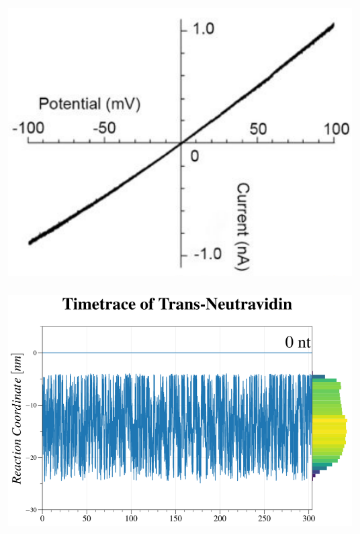 \begin{figure}[ht]

  \begin{centering}
  \begin{subfigure}[t]{\dimexpr.29\linewidth-1.3em\relax}
  \centering
  \vspace{0.6cm}
  \includegraphics[width=1\linewidth,valign=t]{Figures/IV-100.png}
  \end{subfigure}%
  \begin{subfigure}[t]{\dimexpr.5\linewidth-1.3em\relax}
  \centering
  \vspace{-0.1cm}
  \includegraphics[width=\linewidth,valign=t]{Figures/MR-100.png}

\end{subfigure}
\end{centering}
\end{figure}
